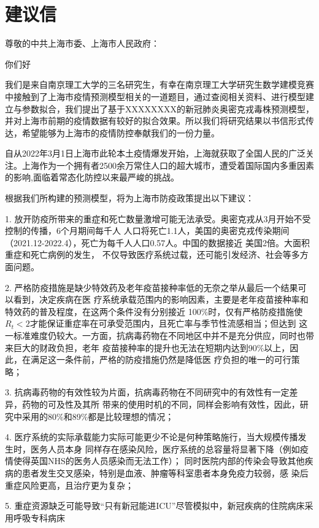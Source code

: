 \documentclass[bwprint]{gmcmthesis}
\numberwithin{figure}{section}
\begin{document}
\section{建议信}
\begin{flushleft}
    尊敬的中共上海市委、上海市人民政府：
\end{flushleft}
\par 你们好
\par 我们是来自南京理工大学的三名研究生，有幸在南京理工大学研究生数学建模竞赛中接触到了上海市疫情预测模型相关的一道题目，通过查阅相关资料、进行模型建立与参数拟合，我们提出了基于XXXXXXXX的新冠肺炎奥密克戎毒株预测模型，并对上海市前期的疫情数据有较好的拟合效果。所以我们将研究结果以书信形式传达，希望能够为上海市的疫情防控奉献我们的一份力量。
\par 自从2022年3月1日上海市此轮本土疫情爆发开始，上海就获取了全国人民的广泛关注。上海作为一个拥有者2500余万常住人口的超大城市，遭受着国际国内多重因素的影响,面临着常态化防控以来最严峻的挑战。
\par 根据我们所构建的预测模型，将为上海市防疫政策提出以下建议：
\par 1. 放开防疫所带来的重症和死亡数量激增可能无法承受。奥密克戎从3月开始不受控制的传播，6个月期间每千人
人口将死亡1.1人，美国的奥密克戎传染期间（2021.12-2022.4），死亡为每千人人口0.57人。中国的数据接近
美国2倍。大面积重症和死亡病例的发生， 不仅导致医疗系统过载，还可能引发经济、社会等多方面问题。
\par 2. 严格防疫措施是缺少特效药及老年疫苗接种率低的无奈之举从最后一个结果可以看到，决定疾病在医
疗系统承载范围内的影响因素，主要是老年疫苗接种率和特效药的普及程度，在这两个条件没有分别接近
100$\%$时，仅有严格防疫措施使$R_t<2$才能保证重症率在可承受范围内，且死亡率与季节性流感相当；但达到
这一标准难度仍较大。一方面，抗病毒药物在不同地区中并不是充分供应，同时也带来巨大的财政负担，老年
疫苗接种率的提升也无法在短期内达到90$\%$以上，因此，在满足这一条件前，严格的防疫措施仍然是降低医
疗负担的唯一的可行策略；
\par 3. 抗病毒药物的有效性较为片面，抗病毒药物在不同研究中的有效性有一定差异，药物的可及性及其所
带来的使用时机的不同，同样会影响有效性，因此，研究中采用的80$\%$和89$\%$都是比较理想的情况；
\par 4. 医疗系统的实际承载能力实际可能更少不论是何种策略施行，当大规模传播发生时，医务人员本身
同样存在感染风险，医疗系统的总容量将显著下降（例如疫情使得英国NHS的医务人员感染而无法工作）；
同时医院内部的传染会导致其他疾病的患者发生交叉感染，特别是血液、肿瘤等科室患者本身免疫力较弱，感
染后重症风险更高，且治疗更为复杂；
\par 5. 重症资源缺乏可能导致“只有新冠能进ICU”尽管模拟中，新冠疾病的住院病床采用呼吸专科病床
\end{document}
